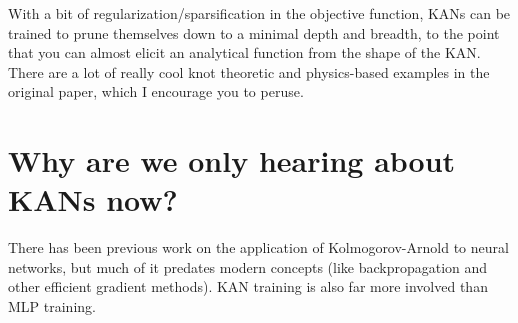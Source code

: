 \begin{frame}
    With a bit of regularization/sparsification in the objective function, 
    KANs can be trained to prune themselves down to a minimal depth and breadth, to the point that
    you can almost elicit an analytical function from the shape of the KAN. \\
    There are a lot of really cool knot theoretic and physics-based examples in 
    the original paper, which I encourage you to peruse.
\end{frame}

\section{Why are we only hearing about KANs now?}
\begin{frame}
    There has been previous work on the application of Kolmogorov-Arnold to neural networks,
    but much of it predates modern concepts (like backpropagation and other efficient
    gradient methods). KAN training is also far more involved than MLP training. 
\end{frame}

